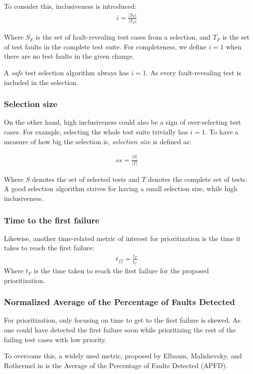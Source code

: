 To consider this, inclusiveness is introduced:
\begin{align*}
i = \frac{|S_F|}{|T_F|}
\end{align*}

Where $S_F$ is the set of fault-revealing test cases from a selection, and $T_F$ is the set of test faults in the complete
test suite. For completeness, we define $i=1$ when there are no test faults in the given change.

A \emph{safe} test selection algorithm \cite{366926} always has $i = 1$. As every fault-revealing test is included in the selection.

\subsubsection{Selection size}
On the other hand, high inclusiveness could also be a sign of over-selecting test cases. For example, selecting the whole test
suite trivially has $i=1$. To have a measure of how big the selection is, \emph{selection size} is defined as:

\begin{align*}
    ss = \frac{|S|}{|T|}
\end{align*}

Where $S$ denotes the set of selected tests and $T$ denotes the complete set of tests.
A good selection algorithm strives for having a small selection size, while high inclusiveness.

\subsubsection{Time to the first failure}
Likewise, another time-related metric of interest for prioritization is the time it takes to reach the first failure:
\begin{align*}
    t_{ff} = \frac{t_F}{t_C}
\end{align*}
Where $t_F$ is the time taken to reach the first failure for the proposed prioritization.

\subsubsection{Normalized Average of the Percentage of Faults Detected}
For prioritization, only focusing on time to get to the first failure is skewed. As one could have detected the first failure
soon while prioritizing the rest of the failing test cases with low priority.

To overcome this, a widely used metric, proposed by Elbaum, Malishevsky, and Rothermel in \cite{elbaum2002} is the 
Average of the Percentage of Faults Detected (APFD).

